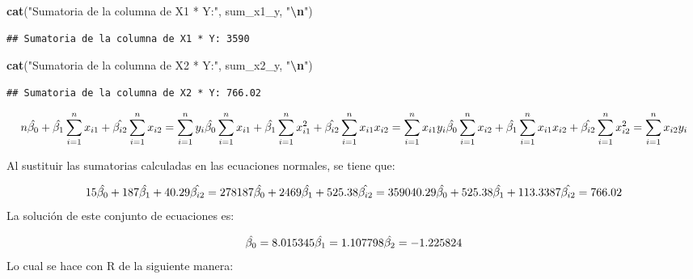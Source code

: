 \documentclass[
]{book}
\newenvironment{Shaded}{\begin{snugshade}}{\end{snugshade}}
\newcommand{\FunctionTok}[1]{\textcolor[rgb]{0.13,0.29,0.53}{\textbf{#1}}}
\newcommand{\NormalTok}[1]{#1}
\newcommand{\SpecialCharTok}[1]{\textcolor[rgb]{0.81,0.36,0.00}{\textbf{#1}}}
\newcommand{\StringTok}[1]{\textcolor[rgb]{0.31,0.60,0.02}{#1}}
\begin{document}
\begin{Shaded}
\begin{Highlighting}[]
\FunctionTok{cat}\NormalTok{(}\StringTok{"Sumatoria de la columna de X1 * Y:"}\NormalTok{, sum\_x1\_y, }\StringTok{"}\SpecialCharTok{\textbackslash{}n}\StringTok{"}\NormalTok{)}
\end{Highlighting}
\end{Shaded}

\begin{verbatim}
## Sumatoria de la columna de X1 * Y: 3590
\end{verbatim}

\begin{Shaded}
\begin{Highlighting}[]
\FunctionTok{cat}\NormalTok{(}\StringTok{"Sumatoria de la columna de X2 * Y:"}\NormalTok{, sum\_x2\_y, }\StringTok{"}\SpecialCharTok{\textbackslash{}n}\StringTok{"}\NormalTok{)}
\end{Highlighting}
\end{Shaded}

\begin{verbatim}
## Sumatoria de la columna de X2 * Y: 766.02
\end{verbatim}

\[
n\hat{\beta_{0}} + \hat{\beta_{1}}\sum_{i=1}^nx_{i1} + \hat{\beta_{i2}}\sum_{i=1}^nx_{i2} = \sum_{i=1}^ny_{i} \\
\hat{\beta_{0}}\sum_{i=1}^nx_{i1} + \hat{\beta_{1}}\sum_{i=1}^nx_{i1}^2 + \hat{\beta_{i2}}\sum_{i=1}^nx_{i1}x_{i2} = \sum_{i=1}^nx_{i1}y_{i} \\
\hat{\beta_{0}}\sum_{i=1}^nx_{i2} + \hat{\beta_{1}}\sum_{i=1}^nx_{i1}x_{i2} + \hat{\beta_{i2}}\sum_{i=1}^nx_{i2}^2 = \sum_{i=1}^nx_{i2}y_{i}
\]

Al sustituir las sumatorias calculadas en las ecuaciones normales, se tiene que:

\[
15\hat{\beta_{0}} + 187\hat{\beta_{1}}  + 40.29\hat{\beta_{i2}} = 278 \\
187\hat{\beta_{0}} + 2469\hat{\beta_{1}} + 525.38\hat{\beta_{i2}} = 3590  \\
40.29\hat{\beta_{0}} + 525.38\hat{\beta_{1}} + 113.3387\hat{\beta_{i2}} = 766.02
\] La solución de este conjunto de ecuaciones es:

\[
\hat{\beta_{0}}= 8.015345 \\
\hat{\beta_{1}}= 1.107798 \\
\hat{\beta_{2}}= -1.225824 \\
\label{eq:coefs-beta-valores-estimados}
\] Lo cual se hace con R de la siguiente manera:
\end{document}
